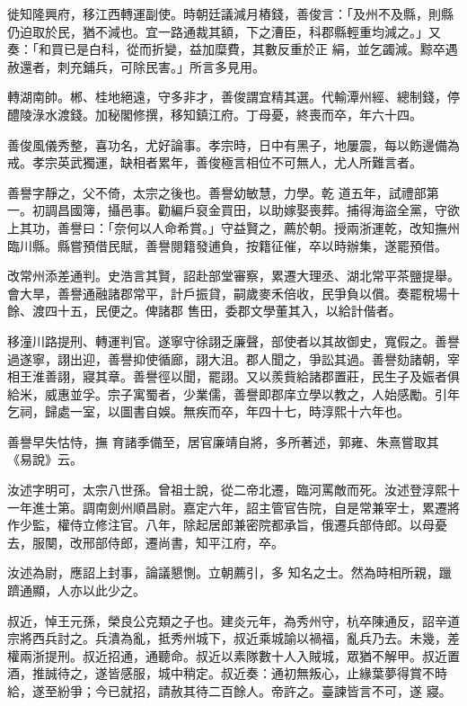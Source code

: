 \begin{pinyinscope}
 徙知隆興府，移江西轉運副使。時朝廷議減月樁錢，善俊言：「及州不及縣，則縣仍迫取於民，猶不減也。宜一路通裁其額，下之漕臣，科郡縣輕重均減之。」又奏：「和買已是白科，從而折變，益加糜費，其數反重於正
 絹，並乞蠲減。黥卒遇赦還者，刺充鋪兵，可除民害。」所言多見用。



 轉湖南帥。郴、桂地絕遠，守多非才，善俊謂宜精其選。代輸潭州經、總制錢，停醴陵淥水渡錢。加秘閣修撰，移知鎮江府。丁母憂，終喪而卒，年六十四。



 善俊風儀秀整，喜功名，尤好論事。孝宗時，日中有黑子，地屢震，每以飭邊備為戒。孝宗英武獨運，缺相者累年，善俊極言相位不可無人，尤人所難言者。



 善譽字靜之，父不倚，太宗之後也。善譽幼敏慧，力學。乾
 道五年，試禮部第一。初調昌國簿，攝邑事。勸編戶裒金買田，以助嫁娶喪葬。捕得海盜全黨，守欲上其功，善譽曰：「奈何以人命希賞。」守益賢之，薦於朝。授兩浙運乾，改知撫州臨川縣。縣嘗預借民賦，善譽閱籍發逋負，按籍征催，卒以時辦集，遂罷預借。



 改常州添差通判。史浩言其賢，詔赴部堂審察，累遷大理丞、湖北常平茶鹽提舉。會大旱，善譽通融諸郡常平，計戶振貸，嗣歲麥禾倍收，民爭負以償。奏罷稅場十餘、渡四十五，民便之。俾諸郡
 售田，委郡文學董其入，以給計偕者。



 移潼川路提刑、轉運判官。遂寧守徐詡乏廉聲，部使者以其故御史，寬假之。善譽過遂寧，詡出迎，善譽抑使循廊，詡大沮。郡人聞之，爭訟其過。善譽劾諸朝，宰相王淮善詡，寢其章。善譽徑以聞，罷詡。又以羨貲給諸郡置莊，民生子及娠者俱給米，威惠並孚。宗子寓蜀者，少業儒，善譽即郡庠立學以教之，人始感勵。引年乞祠，歸處一室，以圖書自娛。無疾而卒，年四十七，時淳熙十六年也。



 善譽早失怙恃，撫
 育諸季備至，居官廉靖自將，多所著述，郭雍、朱熹嘗取其《易說》云。



 汝述字明可，太宗八世孫。曾祖士說，從二帝北遷，臨河罵敵而死。汝述登淳熙十一年進士第。調南劍州順昌尉。嘉定六年，詔主管官告院，自是常兼宰士，累遷將作少監，權侍立修注官。八年，除起居郎兼密院都承旨，俄遷兵部侍郎。以母憂去，服闋，改邢部侍郎，遷尚書，知平江府，卒。



 汝述為尉，應詔上封事，論議懇惻。立朝薦引，多
 知名之士。然為時相所親，躐躋通顯，人亦以此少之。



 叔近，悼王元孫，榮良公克類之子也。建炎元年，為秀州守，杭卒陳通反，詔辛道宗將西兵討之。兵潰為亂，抵秀州城下，叔近乘城諭以禍福，亂兵乃去。未幾，差權兩浙提刑。叔近招通，通聽命。叔近以素隊數十人入賊城，眾猶不解甲。叔近置酒，推誠待之，遂皆感服，城中稍定。叔近奏：通初無叛心，止緣葉夢得賞不時給，遂至紛爭；今已就招，請赦其待二百餘人。帝許之。臺諫皆言不可，遂
 寢。




\end{pinyinscope}
